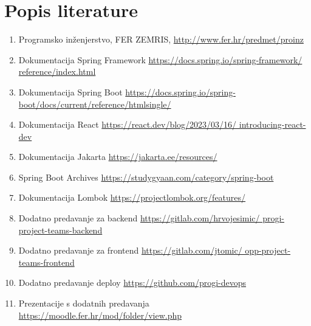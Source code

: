 \chapter*{Popis literature}
	 	
 		
		
		\begin{enumerate}
			
			
			\item  Programsko inženjerstvo, FER ZEMRIS, \url{http://www.fer.hr/predmet/proinz}
			\item Dokumentacija Spring Framework
			\url{https://docs.spring.io/spring-framework/  reference/index.html}
			\item Dokumentacija Spring Boot
			\url{https://docs.spring.io/spring-boot/docs/current/reference/htmlsingle/}
			\item Dokumentacija React
			\url{https://react.dev/blog/2023/03/16/          introducing-react-dev}
			\item Dokumentacija Jakarta
			\url{https://jakarta.ee/resources/}
			\item Spring Boot Archives
			\url{https://studygyaan.com/category/spring-boot}
			\item Dokumentacija Lombok
			\url{https://projectlombok.org/features/}
			\item Dodatno predavanje za backend \newline
			\url{https://gitlab.com/hrvojesimic/  progi-project-teams-backend}
			\item Dodatno predavanje za frontend \newline
			\url{https://gitlab.com/jtomic/  opp-project-teams-frontend}
			\item Dodatno predavanje deploy
			\url{https://github.com/progi-devops}
			\item Prezentacije s dodatnih predavanja
			\url{https://moodle.fer.hr/mod/folder/view.php}
			
			
		\end{enumerate}
		
		 
